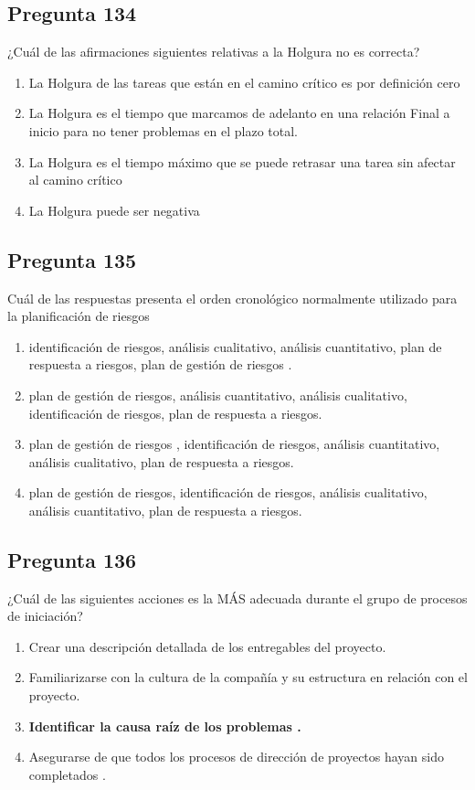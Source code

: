 \documentclass[11pt,a4paper]{article}
\begin{document}
\subsection*{Pregunta 134}
¿Cuál de las afirmaciones siguientes relativas a la Holgura no es correcta?

\begin{enumerate}[label=\alph*)]
  \item La Holgura de las tareas que están en el camino crítico es por definición cero
  \item La Holgura es el tiempo que marcamos de adelanto en una relación Final a inicio para no tener problemas en el plazo total.
  \item La Holgura es el tiempo máximo que se puede retrasar una tarea sin afectar al camino crítico
  \item La Holgura puede ser negativa
\end{enumerate}

\subsection*{Pregunta 135}
Cuál de las respuestas presenta el orden cronológico normalmente utilizado para la planificación de riesgos

\begin{enumerate}[label=\alph*)]
  \item identificación de riesgos, análisis cualitativo, análisis cuantitativo, plan de respuesta a riesgos, plan de gestión de riesgos .
  \item plan de gestión de riesgos, análisis cuantitativo, análisis cualitativo, identificación de riesgos, plan de respuesta a riesgos.
  \item plan de gestión de riesgos , identificación de riesgos, análisis cuantitativo, análisis cualitativo, plan de respuesta a riesgos.
  \item plan de gestión de riesgos, identificación de riesgos, análisis cualitativo, análisis cuantitativo, plan de respuesta a riesgos.
\end{enumerate}

\subsection*{Pregunta 136}
¿Cuál de las siguientes acciones es la MÁS adecuada durante el grupo de procesos de iniciación?

\begin{enumerate}[label=\alph*)]
  \item Crear una descripción detallada de los entregables del proyecto.
  \item Familiarizarse con la cultura de la compañía y su estructura en relación con el proyecto.
  \item \textbf{Identificar la causa raíz de los problemas .}
  \item Asegurarse de que todos los procesos de dirección de proyectos hayan sido completados .
\end{enumerate}
\end{document}
